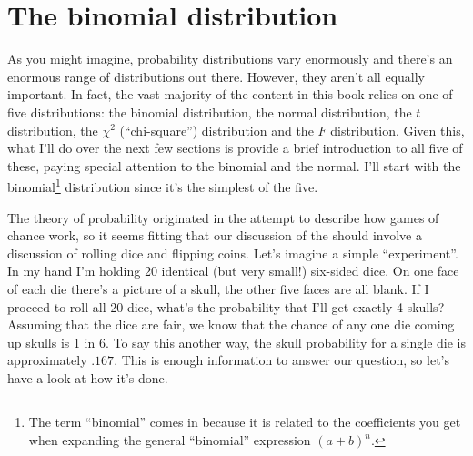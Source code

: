 \section{The binomial distribution\label{sec:binomial}}

As you might imagine, probability distributions vary enormously and there's an enormous range of distributions out there. However, they aren't all equally important. In fact, the vast majority of the content in this book relies on one of five distributions: the binomial distribution, the normal distribution, the $t$ distribution, the $\chi^2$ (``chi-square'') distribution and the $F$ distribution. Given this, what I'll do over the next few sections is provide a brief introduction to all five of these, paying special attention to the binomial and the normal. I'll start with the binomial\footnote{The term ``binomial'' comes in because it is related to the coefficients you get when expanding the general ``binomial'' expression $(a+b)^n$.} distribution since it's the simplest of the five.


The theory of probability originated in the attempt to describe how games of chance work, so it seems fitting that our discussion of the  should involve a discussion of rolling dice and flipping coins. Let's imagine a simple ``experiment''. In my hand I'm holding 20 identical (but very small!) six-sided dice. On one face of each die there's a picture of a skull, the other five faces are all blank. If I proceed to roll all 20 dice, what's the probability that I'll get exactly 4 skulls? Assuming that the dice are fair, we know that the chance of any one die coming up skulls is 1 in 6. To say this another way, the skull probability for a single die is approximately $.167$. This is enough information to answer our question, so let's have a look at how it's done. 


